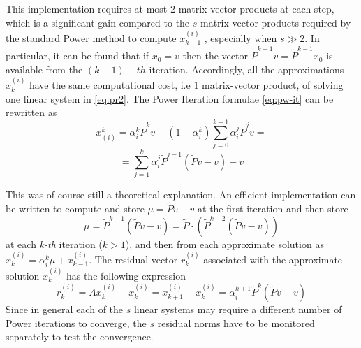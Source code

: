 This implementation requires at most $2$ matrix-vector products at each step, which is a significant gain compared to the $s$ matrix-vector products required by the standard Power method to compute $x^{(i)}_{k+1}$ , especially when $s \gg 2$. In particular, it can be found that if $x_0 = v$ then the vector $ \tilde P^{k-1} v = \tilde P^{k-1} x_0$ is available from the $(k-1)-th$ iteration. Accordingly, all the approximations $x_k^{(i)}$ have the same computational cost, i.e $1$ matrix-vector product, of solving one linear system in \ref{eq:pr2}. The Power Iteration formulae \ref{eq:pw-it} can be rewritten as
\begin{equation}
    x_{(i)}^{k} = \alpha_i^k \tilde P^k v + (1 - \alpha_i^k) \sum_{j=0}^{k-1} \alpha_i^j \tilde P^j v =
\end{equation}
$$ =\sum _{j=1}^k \alpha_i^j \tilde P^{j-1} (\tilde P v - v) + v $$

\noindent This was of course still a theoretical explanation. An efficient implementation can be written to compute and store $\mu = \tilde Pv -v$ at the first iteration and then store
$$\mu = \tilde P^{k-1}(\tilde P v - v) = \tilde P \cdot (\tilde P^{k-2}(\tilde P v - v))$$
at each \emph{k-th} iteration ($k  > 1$), and then from each approximate solution as $x_k^{(i)} = \alpha_i^k \mu + x_{k-1}^{(i)}$. The residual vector $r_k^{(i)}$ associated with the approximate solution $x_k^{(i)}$ has the following expression
\begin{equation}
    r_k^{(i)} = A x_k^{(i)} - x_k^{(i)} = x_{k+1}^{(i)} - x_k^{(i)} = \alpha_i^{k+1} \tilde P^k (\tilde P v - v)
\end{equation}
Since in general each of the $s$ linear systems may require a different number of Power iterations to converge, the $s$ residual norms have to be monitored separately to test the convergence. \vspace{0.4cm}

